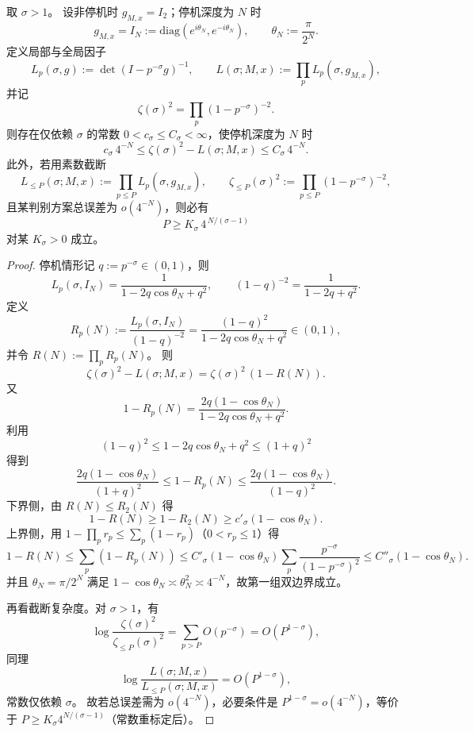 \begin{theorem}\label{thm:xi-time-part9g-langlands-euler-separation}
取 \(\sigma>1\)。
设非停机时 \(g_{M,x}=I_2\)；停机深度为 \(N\) 时
\[
g_{M,x}=I_N:=\mathrm{diag}(e^{i\theta_N},e^{-i\theta_N}),
\qquad
\theta_N:=\frac{\pi}{2^N}.
\]
定义局部与全局因子
\[
L_p(\sigma,g):=\det(I-p^{-\sigma}g)^{-1},
\qquad
L(\sigma;M,x):=\prod_p L_p(\sigma,g_{M,x}),
\]
并记
\[
\zeta(\sigma)^2=\prod_p(1-p^{-\sigma})^{-2}.
\]
则存在仅依赖 \(\sigma\) 的常数 \(0<c_\sigma\le C_\sigma<\infty\)，使停机深度为 \(N\) 时
\[
c_\sigma\,4^{-N}
\le
\zeta(\sigma)^2-L(\sigma;M,x)
\le
C_\sigma\,4^{-N}.
\]
此外，若用素数截断
\[
L_{\le P}(\sigma;M,x):=\prod_{p\le P}L_p(\sigma,g_{M,x}),\qquad
\zeta_{\le P}(\sigma)^2:=\prod_{p\le P}(1-p^{-\sigma})^{-2},
\]
且某判别方案总误差为 \(o(4^{-N})\)，则必有
\[
P\ge K_\sigma\,4^{\,N/(\sigma-1)}
\]
对某 \(K_\sigma>0\) 成立。
\end{theorem}
\begin{proof}
停机情形记 \(q:=p^{-\sigma}\in(0,1)\)，则
\[
L_p(\sigma,I_N)=\frac{1}{1-2q\cos\theta_N+q^2},
\qquad
(1-q)^{-2}=\frac{1}{1-2q+q^2}.
\]
定义
\[
R_p(N):=\frac{L_p(\sigma,I_N)}{(1-q)^{-2}}
=\frac{(1-q)^2}{1-2q\cos\theta_N+q^2}\in(0,1),
\]
并令 \(R(N):=\prod_p R_p(N)\)。
则
\[
\zeta(\sigma)^2-L(\sigma;M,x)=\zeta(\sigma)^2\,(1-R(N)).
\]
又
\[
1-R_p(N)
=\frac{2q(1-\cos\theta_N)}{1-2q\cos\theta_N+q^2}.
\]
利用
\[
(1-q)^2\le 1-2q\cos\theta_N+q^2\le (1+q)^2
\]
得到
\[
\frac{2q(1-\cos\theta_N)}{(1+q)^2}
\le
1-R_p(N)
\le
\frac{2q(1-\cos\theta_N)}{(1-q)^2}.
\]
下界侧，由 \(R(N)\le R_2(N)\) 得
\[
1-R(N)\ge 1-R_2(N)\ge c'_\sigma(1-\cos\theta_N).
\]
上界侧，用 \(1-\prod_p r_p\le \sum_p(1-r_p)\)（\(0<r_p\le1\)）得
\[
1-R(N)\le \sum_p(1-R_p(N))
\le C'_\sigma(1-\cos\theta_N)\sum_p\frac{p^{-\sigma}}{(1-p^{-\sigma})^2}
\le C''_\sigma(1-\cos\theta_N).
\]
并且 \(\theta_N=\pi/2^N\) 满足 \(1-\cos\theta_N\asymp \theta_N^2\asymp 4^{-N}\)，故第一组双边界成立。

再看截断复杂度。对 \(\sigma>1\)，有
\[
\log\frac{\zeta(\sigma)^2}{\zeta_{\le P}(\sigma)^2}
=\sum_{p>P}O(p^{-\sigma})
=O(P^{1-\sigma}),
\]
同理
\[
\log\frac{L(\sigma;M,x)}{L_{\le P}(\sigma;M,x)}
=O(P^{1-\sigma}),
\]
常数仅依赖 \(\sigma\)。
故若总误差需为 \(o(4^{-N})\)，必要条件是
\(
P^{1-\sigma}=o(4^{-N})
\)，等价于
\(
P\ge K_\sigma 4^{N/(\sigma-1)}
\)（常数重标定后）。
\end{proof}
